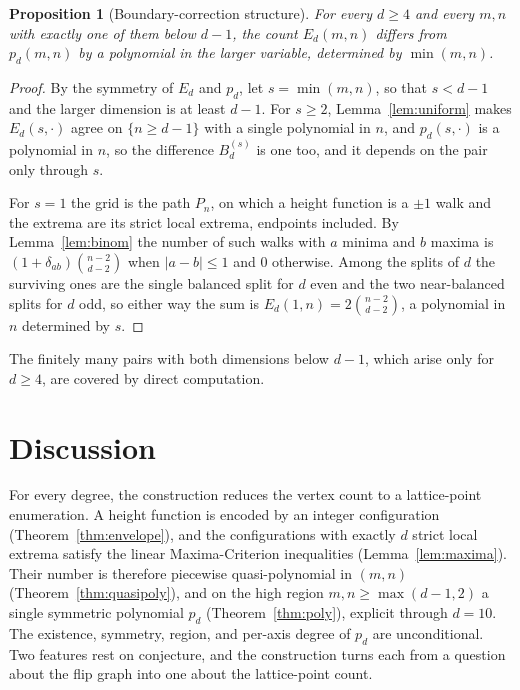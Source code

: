 \documentclass[11pt]{article}
\newtheorem{proposition}[theorem]{Proposition}
\theoremstyle{definition}
\theoremstyle{remark}
\begin{document}
\begin{proposition}[Boundary-correction structure]\label{prop:meta}
For every $d\ge4$ and every $m,n$ with exactly one of them below $d-1$, the
count $E_d(m,n)$ differs from $p_d(m,n)$ by a polynomial in the larger
variable, determined by $\min(m,n)$.
\end{proposition}

\begin{proof}
By the symmetry of $E_d$ and $p_d$, let $s=\min(m,n)$, so that $s<d-1$ and the
larger dimension is at least $d-1$. For $s\ge2$, Lemma~\ref{lem:uniform} makes
$E_d(s,\cdot)$ agree on $\{n\ge d-1\}$ with a single polynomial in $n$, and
$p_d(s,\cdot)$ is a polynomial in $n$, so the difference $B_d^{(s)}$ is one too,
and it depends on the pair only through $s$.

\medskip\noindent
For $s=1$ the grid is the path $P_n$, on which a height function is a $\pm1$
walk and the extrema are its strict local extrema, endpoints included. By
Lemma~\ref{lem:binom} the number of such walks with $a$ minima and $b$ maxima
is $(1+\delta_{ab})\binom{n-2}{d-2}$ when $|a-b|\le1$ and $0$ otherwise. Among
the splits of $d$ the surviving ones are the single balanced split for $d$ even
and the two near-balanced splits for $d$ odd, so either way the sum is
$E_d(1,n)=2\binom{n-2}{d-2}$, a polynomial in $n$ determined by $s$.
\end{proof}

The finitely many pairs with both dimensions below $d-1$, which arise only for
$d\ge4$, are covered by direct computation.

\section{Discussion}\label{sec:discussion}

For every degree, the construction reduces the vertex count to a lattice-point
enumeration. A height function is encoded by an integer configuration
(Theorem~\ref{thm:envelope}), and the configurations with exactly $d$ strict
local extrema satisfy the linear Maxima-Criterion inequalities
(Lemma~\ref{lem:maxima}). Their number is therefore piecewise quasi-polynomial
in $(m,n)$ (Theorem~\ref{thm:quasipoly}), and on the high region
$m,n\ge\max(d-1,2)$ a single symmetric polynomial $p_d$
(Theorem~\ref{thm:poly}), explicit through $d=10$. The existence, symmetry,
region, and per-axis degree of $p_d$ are unconditional. Two features rest on
conjecture, and the construction turns each from a question about the flip graph
into one about the lattice-point count.
\end{document}
